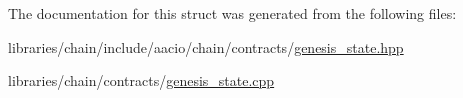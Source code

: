The documentation for this struct was generated from the following files\+:\begin{DoxyCompactItemize}
\item 
libraries/chain/include/aacio/chain/contracts/\mbox{\hyperlink{genesis__state_8hpp}{genesis\+\_\+state.\+hpp}}\item 
libraries/chain/contracts/\mbox{\hyperlink{genesis__state_8cpp}{genesis\+\_\+state.\+cpp}}\end{DoxyCompactItemize}
